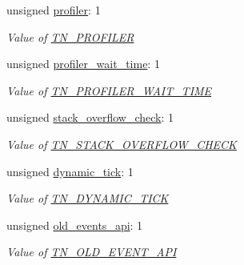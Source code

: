 \begin{DoxyCompactItemize}
unsigned \hyperlink{struct__TN__BuildCfg_a6fd12ee60f364a7473e2e47d9408428b}{profiler}\+: 1
\begin{DoxyCompactList}\small\item\em Value of {\ttfamily \hyperlink{tn__cfg__default_8h_a49a546b18cc1f75b51d4cf8b290634dd}{T\+N\+\_\+\+P\+R\+O\+F\+I\+L\+ER}} \end{DoxyCompactList}\item 
\mbox{\label{struct__TN__BuildCfg_a56464cf4f7c4c8b917b620382b7c591c}} 
unsigned \hyperlink{struct__TN__BuildCfg_a56464cf4f7c4c8b917b620382b7c591c}{profiler\+\_\+wait\+\_\+time}\+: 1
\begin{DoxyCompactList}\small\item\em Value of {\ttfamily \hyperlink{tn__cfg__default_8h_a1c04db5457adb54f7cc38d42b29a5ad7}{T\+N\+\_\+\+P\+R\+O\+F\+I\+L\+E\+R\+\_\+\+W\+A\+I\+T\+\_\+\+T\+I\+ME}} \end{DoxyCompactList}\item 
\mbox{\label{struct__TN__BuildCfg_a6229bff738b95baa79d5fa2e29eb9c0e}} 
unsigned \hyperlink{struct__TN__BuildCfg_a6229bff738b95baa79d5fa2e29eb9c0e}{stack\+\_\+overflow\+\_\+check}\+: 1
\begin{DoxyCompactList}\small\item\em Value of {\ttfamily \hyperlink{tn__cfg__default_8h_ac6a9bbac3b3b25d9b5bc8c21d2e09955}{T\+N\+\_\+\+S\+T\+A\+C\+K\+\_\+\+O\+V\+E\+R\+F\+L\+O\+W\+\_\+\+C\+H\+E\+CK}} \end{DoxyCompactList}\item 
\mbox{\label{struct__TN__BuildCfg_ac0239cf6d48fd8442b24df8d70bde455}} 
unsigned \hyperlink{struct__TN__BuildCfg_ac0239cf6d48fd8442b24df8d70bde455}{dynamic\+\_\+tick}\+: 1
\begin{DoxyCompactList}\small\item\em Value of {\ttfamily \hyperlink{tn__cfg__default_8h_aaee875834a86f961318c584095c366fe}{T\+N\+\_\+\+D\+Y\+N\+A\+M\+I\+C\+\_\+\+T\+I\+CK}} \end{DoxyCompactList}\item 
\mbox{\label{struct__TN__BuildCfg_a7ddde64f1bb2d0425562ad07aec2620d}} 
unsigned \hyperlink{struct__TN__BuildCfg_a7ddde64f1bb2d0425562ad07aec2620d}{old\+\_\+events\+\_\+api}\+: 1
\begin{DoxyCompactList}\small\item\em Value of {\ttfamily \hyperlink{tn__cfg__default_8h_ac61d5f6a716cdcab205a2c8afbde4242}{T\+N\+\_\+\+O\+L\+D\+\_\+\+E\+V\+E\+N\+T\+\_\+\+A\+PI}} \end{DoxyCompactList}\item 

\end{DoxyCompactItemize}
